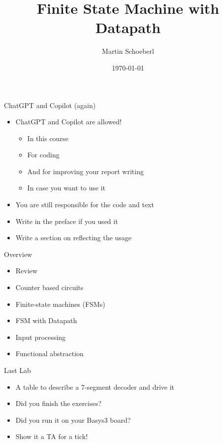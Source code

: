 

\newif\ifbook


\title{Finite State Machine with Datapath}
\author{Martin Schoeberl}
\date{\today}



\begin{frame}
\titlepage
\end{frame}



\begin{frame}[fragile]{ChatGPT and Copilot (again)}
\begin{itemize}
\item ChatGPT and Copilot are allowed!
\begin{itemize}
\item In this course
\item For coding
\item And for improving your report writing
\item In case you want to use it
\end{itemize}
\item You are still responsible for the code and text
\item Write in the preface if you used it
\item Write a section on reflecting the usage
\end{itemize}
\end{frame}

\begin{frame}[fragile]{Overview}
\begin{itemize}
\item Review 
\item Counter based circuits
\item Finite-state machines (FSMs)
\item FSM with Datapath
\item Input processing
\item Functional abstraction
\end{itemize}
\end{frame}



\begin{frame}[fragile]{Last Lab}
\begin{itemize}
\item A table to describe a 7-segment decoder and drive it
\item Did you finish the exercises?
\item Did you run it on your Basys3 board?
\item Show it a TA for a tick!
\end{itemize}
\end{frame}

